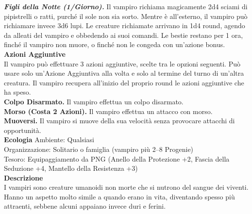\begin{multicols}{2}
\emph{\textbf{Figli della Notte (1/Giorno).}} Il vampiro richiama magicamente 2d4 sciami di pipistrelli o ratti, purché il sole non sia sorto. Mentre è all'esterno, il vampiro può richiamare invece 3d6 lupi. Le creature richiamate arrivano in 1d4 round, agendo da alleati del vampiro e obbedendo ai suoi comandi. Le bestie restano per 1 ora, finché il vampiro non muore, o finché non le congeda con un'azione bonus.  \\
\textbf{Azioni Aggiuntive}\\
Il vampiro può effettuare 3 azioni aggiuntive, scelte tra le opzioni seguenti. Può usare solo un'Azione Aggiuntiva alla volta e solo al termine del turno di un'altra creatura. Il vampiro recupera all'inizio del proprio round le azioni aggiuntive che ha speso.\\
\textbf{Colpo Disarmato.} Il vampiro effettua un colpo disarmato. \\
\textbf{Morso (Costa 2 Azioni).} Il vampiro effettua un attacco con morso.\\
\textbf{Muoversi.} Il vampiro si muove della sua velocità senza provocare attacchi di opportunità.\\
\textbf{Ecologia}
Ambiente: Qualsiasi\\
Organizzazione: Solitario o famiglia (vampiro più 2–8 Progenie)\\
Tesoro: Equipaggiamento da PNG (Anello della Protezione +2, Fascia della Seduzione +4, Mantello della Resistenza +3)\\
\textbf{Descrizione}\\
I vampiri sono creature umanoidi non morte che si nutrono del sangue dei viventi. Hanno un aspetto molto simile a quando erano in vita, diventando spesso più attraenti, sebbene alcuni appaiano invece duri e ferini.\\


\end{multicols}

